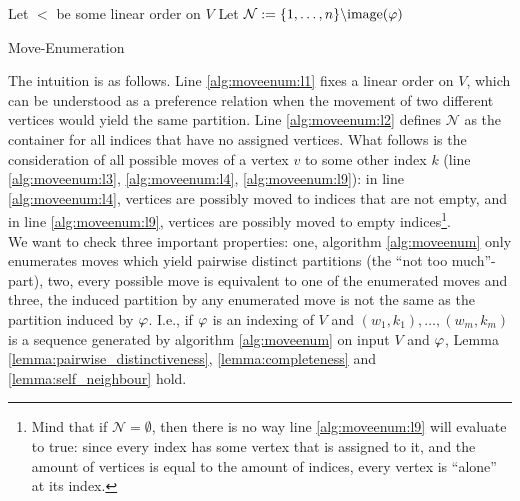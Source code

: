 \begin{algorithm}[H]
    \SetAlgoLined
    \DontPrintSemicolon
    Let $<$ be some linear order on $V$ \label{alg:moveenum:l1} \;
    Let $\mathcal{N} := \{1,\dots,n\}\backslash \mathrm{image}(\varphi)$  \label{alg:moveenum:l2} \;
    \caption{Move-Enumeration} \label{alg:moveenum}
\end{algorithm}

The intuition is as follows. Line \ref{alg:moveenum:l1} fixes a linear order on $V$, which can be understood as a preference relation when the movement of two different vertices would yield the same partition. Line \ref{alg:moveenum:l2} defines $\mathcal{N}$ as the container for all indices that have no assigned vertices. What follows is the consideration of all possible moves of a vertex $v$ to some other index $k$ (line \ref{alg:moveenum:l3}, \ref{alg:moveenum:l4}, \ref{alg:moveenum:l9}): in line \ref{alg:moveenum:l4}, vertices are possibly moved to indices that are not empty, and in line \ref{alg:moveenum:l9}, vertices are possibly moved to empty indices\footnote{Mind that if $\mathcal{N} = \emptyset$, then there is no way line \ref{alg:moveenum:l9} will evaluate to true: since every index has some vertex that is assigned to it, and the amount of vertices is equal to the amount of indices, every vertex is ``alone'' at its index.}.\\
We want to check three important properties: one, algorithm \ref{alg:moveenum} only enumerates moves which yield pairwise distinct partitions (the ``not too much''-part), two, every possible move is equivalent to one of the enumerated moves and three, the induced partition by any enumerated move is not the same as the partition induced by $\varphi$. I.e., if $\varphi$ is an indexing of $V$ and $(w_1,k_1),\dots,(w_m,k_m)$ is a sequence generated by algorithm \ref{alg:moveenum} on input $V$ and $\varphi$, Lemma \ref{lemma:pairwise_distinctiveness}, \ref{lemma:completeness} and \ref{lemma:self_neighbour} hold.

